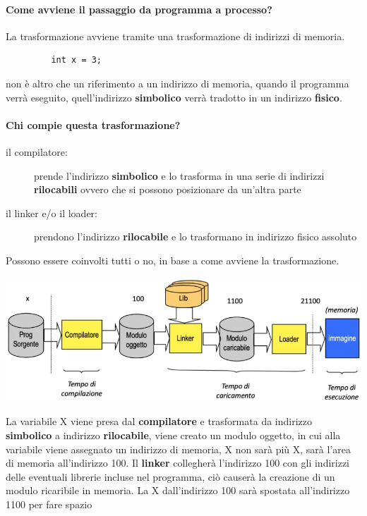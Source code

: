 \documentclass[a4paper, 12pt]{book}
\begin{document}
 \paragraph{Come avviene il passaggio da programma a processo?}
 La trasformazione avviene tramite una trasformazione di indirizzi di memoria.
 \begin{center}
     \begin{verbatim}
         int x = 3;
     \end{verbatim}
 \end{center}
 non è altro che un riferimento a un indirizzo di memoria, quando il programma verrà eseguito, quell'indirizzo
 \textbf{simbolico} verrà tradotto in un indirizzo \textbf{fisico}.
 \paragraph{Chi compie questa trasformazione?}
 \begin{description}
     \item [il compilatore:] prende l'indirizzo \textbf{simbolico} e lo trasforma in una serie di indirizzi \textbf{rilocabili}
     ovvero che si possono posizionare da un'altra parte
     \item [il linker e/o il loader:] prendono l'indirizzo \textbf{rilocabile} e lo trasformano in indirizzo fisico assoluto
 \end{description}
 Possono essere coinvolti tutti o no, in base a come avviene la trasformazione.
 \begin{center}
     \includegraphics[width=1\textwidth]{trasformazione.png}
 \end{center}
La variabile X viene presa dal \textbf{compilatore} e trasformata da indirizzo \textbf{simbolico} a indirizzo \textbf{rilocabile}, viene
creato un modulo oggetto, in cui alla variabile viene assegnato un indirizzo di memoria, X non sarà più X, sarà l'area di memoria
all'indirizzo 100. Il \textbf{linker} collegherà l'indirizzo 100 con gli indirizzi delle eventuali librerie incluse nel programma,
ciò causerà la creazione di un modulo ricaribile in memoria. La X dall'indirizzo 100 sarà spostata all'indirizzo 1100 per fare spazio
\end{document}
